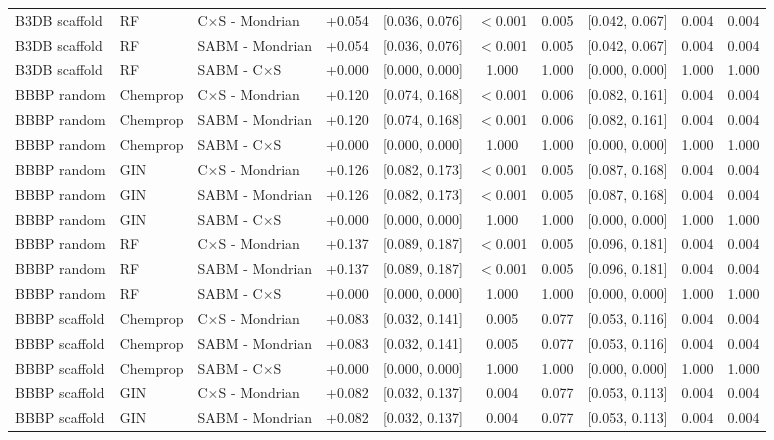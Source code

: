 \begin{tabular}{lllrcccccc}
B3DB scaffold & RF & C$\times$S - Mondrian & +0.054 & [0.036, 0.076] & $<$0.001 & 0.005 & [0.042, 0.067] & 0.004 & 0.004\\
B3DB scaffold & RF & SABM - Mondrian & +0.054 & [0.036, 0.076] & $<$0.001 & 0.005 & [0.042, 0.067] & 0.004 & 0.004\\
B3DB scaffold & RF & SABM - C$\times$S & +0.000 & [0.000, 0.000] & 1.000 & 1.000 & [0.000, 0.000] & 1.000 & 1.000\\
BBBP random & Chemprop & C$\times$S - Mondrian & +0.120 & [0.074, 0.168] & $<$0.001 & 0.006 & [0.082, 0.161] & 0.004 & 0.004\\
BBBP random & Chemprop & SABM - Mondrian & +0.120 & [0.074, 0.168] & $<$0.001 & 0.006 & [0.082, 0.161] & 0.004 & 0.004\\
BBBP random & Chemprop & SABM - C$\times$S & +0.000 & [0.000, 0.000] & 1.000 & 1.000 & [0.000, 0.000] & 1.000 & 1.000\\
BBBP random & GIN & C$\times$S - Mondrian & +0.126 & [0.082, 0.173] & $<$0.001 & 0.005 & [0.087, 0.168] & 0.004 & 0.004\\
BBBP random & GIN & SABM - Mondrian & +0.126 & [0.082, 0.173] & $<$0.001 & 0.005 & [0.087, 0.168] & 0.004 & 0.004\\
BBBP random & GIN & SABM - C$\times$S & +0.000 & [0.000, 0.000] & 1.000 & 1.000 & [0.000, 0.000] & 1.000 & 1.000\\
BBBP random & RF & C$\times$S - Mondrian & +0.137 & [0.089, 0.187] & $<$0.001 & 0.005 & [0.096, 0.181] & 0.004 & 0.004\\
BBBP random & RF & SABM - Mondrian & +0.137 & [0.089, 0.187] & $<$0.001 & 0.005 & [0.096, 0.181] & 0.004 & 0.004\\
BBBP random & RF & SABM - C$\times$S & +0.000 & [0.000, 0.000] & 1.000 & 1.000 & [0.000, 0.000] & 1.000 & 1.000\\
BBBP scaffold & Chemprop & C$\times$S - Mondrian & +0.083 & [0.032, 0.141] & 0.005 & 0.077 & [0.053, 0.116] & 0.004 & 0.004\\
BBBP scaffold & Chemprop & SABM - Mondrian & +0.083 & [0.032, 0.141] & 0.005 & 0.077 & [0.053, 0.116] & 0.004 & 0.004\\
BBBP scaffold & Chemprop & SABM - C$\times$S & +0.000 & [0.000, 0.000] & 1.000 & 1.000 & [0.000, 0.000] & 1.000 & 1.000\\
BBBP scaffold & GIN & C$\times$S - Mondrian & +0.082 & [0.032, 0.137] & 0.004 & 0.077 & [0.053, 0.113] & 0.004 & 0.004\\
BBBP scaffold & GIN & SABM - Mondrian & +0.082 & [0.032, 0.137] & 0.004 & 0.077 & [0.053, 0.113] & 0.004 & 0.004\\

\end{tabular}
